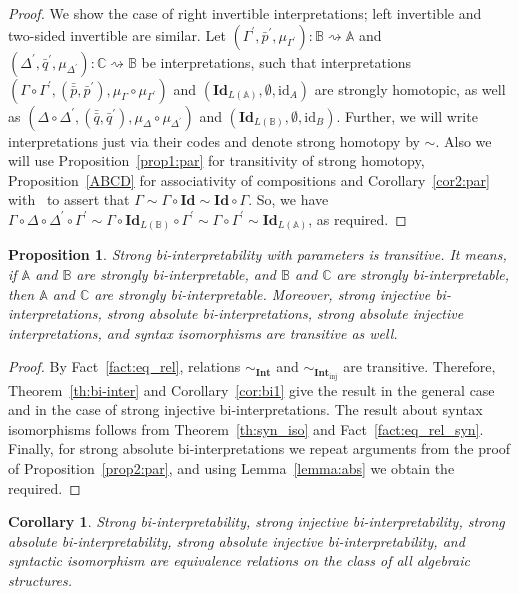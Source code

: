 \documentclass[12pt]{article}
\newtheorem{proposition}{Proposition}
\newtheorem{corollary}{Corollary}
\theoremstyle{definition}
\def\MA{{\mathbb{A}}}
\def\MB{{\mathbb{B}}}
\def\MC{{\mathbb{C}}}
\def\Int{{\mathbf{Int}}}
\newcommand{\Inj}{\mathrm{inj}}
\def\id{{\mathrm{id}}}
\def\Id{{\mathbf{Id}}}
\begin{document}
\begin{proof}
We show the case of right invertible interpretations; left invertible and two-sided invertible are similar. Let $(\Gamma^\prime,\bar p^\prime,\mu_{\Gamma^\prime})\colon\MB\rightsquigarrow\MA$ and $(\Delta^\prime,\bar q^\prime,\mu_{\Delta^\prime})\colon\MC\rightsquigarrow\MB$ be interpretations, such that interpretations $(\Gamma\circ\Gamma^\prime,(\bar{\bar p},\bar p^\prime),\mu_{\Gamma}\circ\mu_{\Gamma^\prime})$ and $(\Id_{L(\MA)},\emptyset,\id_A)$ are strongly homotopic, as well as $(\Delta\circ\Delta^\prime,(\bar{\bar q},\bar q^\prime),\mu_{\Delta}\circ\mu_{\Delta^\prime})$ and $(\Id_{L(\MB)},\emptyset,\id_B)$. Further, we will write interpretations just via their codes and denote strong homotopy by $\sim$. Also we will use Proposition~\ref{prop1:par} for transitivity of strong homotopy, Proposition~\ref{ABCD} for associativity of compositions and Corollary~\ref{cor2:par} with~\cite[Lemma~9]{Th_int1} to assert that $\Gamma\sim\Gamma\circ\Id\sim\Id\circ\Gamma$. So, we have $\Gamma\circ\Delta\circ\Delta^\prime\circ\Gamma^\prime\sim\Gamma\circ\Id_{L(\MB)}\circ\Gamma^\prime\sim\Gamma\circ\Gamma^\prime\sim\Id_{L(\MA)}$, as required. 
\end{proof}

\begin{proposition}
Strong bi-interpretability with parameters is transitive. It means, if $\MA$ and $\MB$ are strongly bi-interpretable, and $\MB$ and $\MC$ are strongly bi-interpretable, then $\MA$ and $\MC$ are strongly bi-interpretable. Moreover, strong injective bi-interpretations, strong absolute bi-interpretations, strong absolute injective interpretations, and syntax isomorphisms are transitive as well.
\end{proposition}

\begin{proof}
By Fact~\ref{fact:eq_rel}, relations $\sim_\Int$ and $\sim_{\Int_\Inj}$ are transitive. Therefore, Theorem~\ref{th:bi-inter} and Corollary~\ref{cor:bi1} give the result in the general case and in the case of strong injective bi-interpretations. The result about syntax isomorphisms follows from Theorem~\ref{th:syn_iso} and Fact~\ref{fact:eq_rel_syn}. Finally, for strong absolute bi-interpretations we repeat arguments from the proof of Proposition~\ref{prop2:par}, and using Lemma~\ref{lemma:abs} we obtain the required. 
\end{proof}

\begin{corollary}
Strong bi-interpretability, strong injective bi-interpretability, strong absolute bi-interpretability, strong absolute injective bi-interpretability, and syntactic isomorphism are equivalence relations on the class of all algebraic structures.
\end{corollary}
\end{document}
